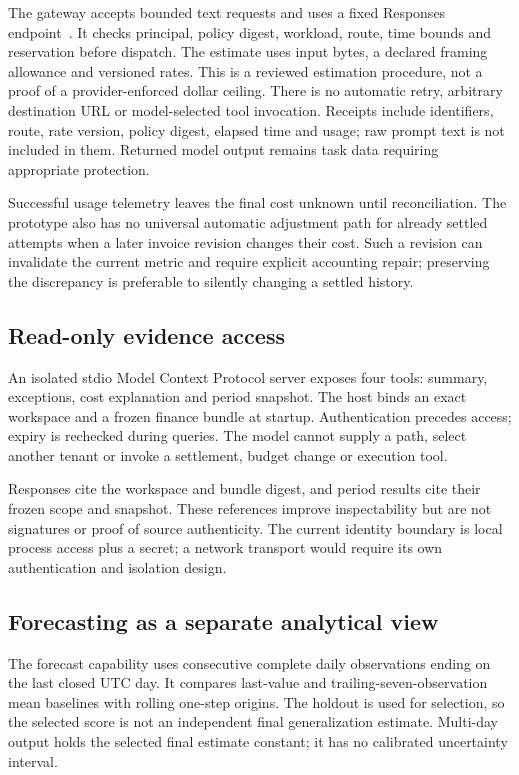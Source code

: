 \documentclass[10pt,twocolumn]{article}
\begin{document}
The gateway accepts bounded text requests and uses a fixed Responses endpoint~\cite{openairesponses}. It checks principal, policy digest, workload, route, time bounds and reservation before dispatch. The estimate uses input bytes, a declared framing allowance and versioned rates. This is a reviewed estimation procedure, not a proof of a provider-enforced dollar ceiling. There is no automatic retry, arbitrary destination URL or model-selected tool invocation. Receipts include identifiers, route, rate version, policy digest, elapsed time and usage; raw prompt text is not included in them. Returned model output remains task data requiring appropriate protection.

Successful usage telemetry leaves the final cost unknown until reconciliation. The prototype also has no universal automatic adjustment path for already settled attempts when a later invoice revision changes their cost. Such a revision can invalidate the current metric and require explicit accounting repair; preserving the discrepancy is preferable to silently changing a settled history.

\subsection{Read-only evidence access}

An isolated stdio Model Context Protocol server exposes four tools: summary, exceptions, cost explanation and period snapshot. The host binds an exact workspace and a frozen finance bundle at startup. Authentication precedes access; expiry is rechecked during queries. The model cannot supply a path, select another tenant or invoke a settlement, budget change or execution tool.

Responses cite the workspace and bundle digest, and period results cite their frozen scope and snapshot. These references improve inspectability but are not signatures or proof of source authenticity. The current identity boundary is local process access plus a secret; a network transport would require its own authentication and isolation design.

\subsection{Forecasting as a separate analytical view}

The forecast capability uses consecutive complete daily observations ending on the last closed UTC day. It compares last-value and trailing-seven-observation mean baselines with rolling one-step origins. The holdout is used for selection, so the selected score is not an independent final generalization estimate. Multi-day output holds the selected final estimate constant; it has no calibrated uncertainty interval.
\end{document}
